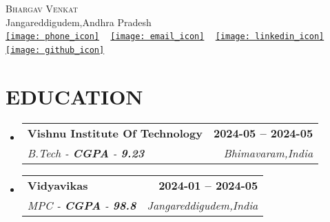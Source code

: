 \documentclass[letterpaper,11pt]{article}
\makeatletter
\newcommand{\resumeSubheading}[4]{
        \vspace{-2pt}\item
          \begin{tabular*}{1.0\textwidth}[t]{l@{\extracolsep{\fill}}r}
            \textbf{\large#1} & \textbf{\small #2} \\
            \textit{\large#3} & \textit{\small #4} \\
            
          \end{tabular*}\vspace{-7pt}
      }
\newcommand{\resumeSubHeadingListStart}{\begin{itemize}[leftmargin=0.0in, label={}]}
\newcommand{\resumeSubHeadingListEnd}{\end{itemize}}
\makeatother
\begin{document}
      
    
        \begin{center}
            {\Huge \scshape Bhargav Venkat} \\ \vspace{1pt}
            Jangareddigudem,Andhra Pradesh \\ \vspace{1pt}
            \small 
            \href{tel:+8179327201}{\texttt{[image: phone\_icon]}}\hspace{0.2em} ~
            \href{mailto:bhargavvenkat515@gmail.com}{\texttt{[image: email\_icon]}}\hspace{0.2em} ~ 
            \href{https://www.linkedin.com/in/bhargav-venkat-polireddy-77153221b/}{\texttt{[image: linkedin\_icon]}}\hspace{0.2em} ~
            \href{github.com/BhargavAlpha}{\texttt{[image: github\_icon]}}\hspace{0.2em} ~
             ~
             ~
         
            \vspace{-8pt}
        \end{center}
    
        \section{EDUCATION}
        \resumeSubHeadingListStart
          
              \resumeSubheading
                {Vishnu Institute Of Technology}{2024-05 -- 2024-05}
                {B.Tech - \textbf{CGPA} - \textbf{9.23}} {Bhimavaram,India}
            
              \resumeSubheading
                {Vidyavikas}{2024-01 -- 2024-05}
                {MPC - \textbf{CGPA} - \textbf{98.8}} {Jangareddigudem,India}
            
        \resumeSubHeadingListEnd
    
\end{document}
